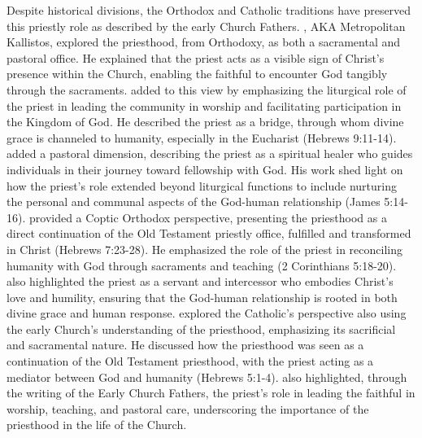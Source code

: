 \documentclass[12pt,doc]{apa7}   	%
\begin{document}
Despite historical divisions, the Orthodox and Catholic traditions have preserved this priestly role as described by the early Church Fathers.  \citet{orthodox_church_ware}, AKA Metropolitan Kallistos, explored the priesthood, from Orthodoxy, as both a sacramental and pastoral office. He explained that the priest acts as a visible sign of Christ’s presence within the Church, enabling the faithful to encounter God tangibly through the sacraments. \citet{eucharist_schmemann} added to this view by emphasizing the liturgical role of the priest in leading the community in worship and facilitating participation in the Kingdom of God. He described the priest as a bridge, through whom divine grace is channeled to humanity, especially in the Eucharist (Hebrews 9:11-14). \citet{priests_zacharias} added a pastoral dimension, describing the priest as a spiritual healer who guides individuals in their journey toward fellowship with God. His work shed light on how the priest’s role extended beyond liturgical functions to include nurturing the personal and communal aspects of the God-human relationship (James 5:14-16).  \cite{priesthood_shenouda} provided a Coptic Orthodox perspective, presenting the priesthood as a direct continuation of the Old Testament priestly office, fulfilled and transformed in Christ (Hebrews 7:23-28). He emphasized the role of the priest in reconciling humanity with God through sacraments and teaching (2 Corinthians 5:18-20). \citeauthor{priesthood_shenouda} also highlighted the priest as a servant and intercessor who embodies Christ’s love and humility, ensuring that the God-human relationship is rooted in both divine grace and human response.  \citet{early_church_akin} explored the Catholic's perspective also using the early Church’s understanding of the priesthood, emphasizing its sacrificial and sacramental nature. He discussed how the priesthood was seen as a continuation of the Old Testament priesthood, with the priest acting as a mediator between God and humanity (Hebrews 5:1-4). \citeauthor{early_church_akin} also highlighted, through the writing of the Early Church Fathers, the priest’s role in leading the faithful in worship, teaching, and pastoral care, underscoring the importance of the priesthood in the life of the Church.
\end{document}
